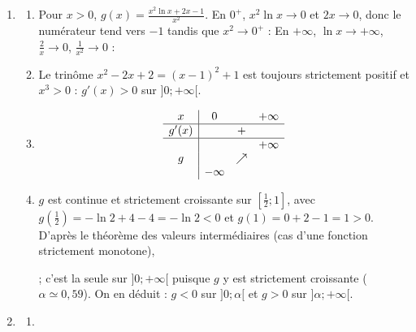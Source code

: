 \begin{enumerate}
   \item
      \begin{enumerate}
         \item {}
            Pour $x > 0$, $g(x) = \frac{x^2 \ln x + 2x - 1}{x^2}$. En $0^+$, $x^2\ln x \to 0$ et $2x \to 0$, donc le num\'erateur
            tend vers $-1$ tandis que $x^2 \to 0^+$ : 
            En $+\infty$, $\ln x \to +\infty$, $\frac{2}{x} \to 0$, $\frac{1}{x^2} \to 0$ : 
         \item {}
            \par\noindent{}
            Le trin\^ome $x^2 - 2x + 2 = (x - 1)^2 + 1$ est toujours strictement positif et $x^3 > 0$ : $g'(x) > 0$ sur $]0 ; +\infty[$.
         \item {}
            \[
               \begin{array}{c|ccc}
                  x & 0 & & +\infty \\ \hline
                  g'(x) & & + & \\ \hline
                  & & & +\infty \\
                  g & & \nearrow & \\
                  & -\infty & &
               \end{array}
            \]
         \item {}
            $g$ est continue et strictement croissante sur $\left[\frac{1}{2} ; 1\right]$, avec
            $g\left(\frac{1}{2}\right) = -\ln 2 + 4 - 4 = -\ln 2 < 0$ et $g(1) = 0 + 2 - 1 = 1 > 0$.
            D'apr\`es le th\'eor\`eme des valeurs interm\'ediaires (cas d'une fonction strictement monotone),
            \par\noindent{}
            ; c'est la seule sur $]0 ; +\infty[$ puisque $g$ y est strictement croissante ($\alpha \simeq 0{,}59$).
            On en d\'eduit : $g < 0$ sur $]0 ; \alpha[$ et $g > 0$ sur $]\alpha ; +\infty[$.
      \end{enumerate}
   \item
      \begin{enumerate}
         \item {}

\end{enumerate}
\end{enumerate}
